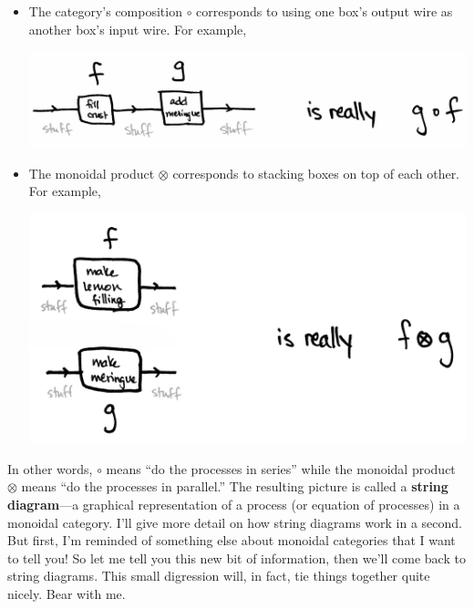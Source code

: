 \documentclass{tufte-handout-tai}
\theoremstyle{plain}
\theoremstyle{definition}
\theoremstyle{remark}
\begin{document}
	\begin{itemize}
	\item The category's composition $\circ$ corresponds to using one box's output wire as another box's input wire. For example,
	\begin{center}
	\includegraphics[width=!,totalheight=!,scale=0.5]{circ.jpg}
	\end{center}
	\item The monoidal product $\otimes$ corresponds to stacking boxes on top of each other. For example,
	\begin{center}
	\includegraphics[width=!,totalheight=!,scale=0.5]{otimes.jpg}
	\end{center}
	\end{itemize}
In other words, $\circ$ means ``do the processes in series'' while the monoidal product $\otimes$ means ``do the processes in parallel.'' The resulting picture is called a \textbf{string diagram}---a graphical representation of a process (or equation of processes) in a monoidal category. I'll give more detail on how string diagrams work in a second.  But first, I'm reminded of something else about monoidal categories that I want to tell you! So let me tell you this new bit of information, then we'll come back to string diagrams. This small digression will, in fact, tie things together quite nicely. Bear with me.
\end{document}
